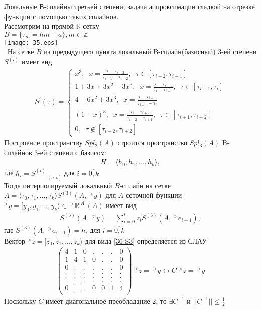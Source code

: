 \documentclass[__main__.tex]{subfiles}
\begin{document}
Локальные В-сплайны третьей степени, задача аппроксимации гладкой на отрезке функции с помощью таких сплайнов.\\

Рассмотрим на прямой $\underline{\mathbb{R}}$ сетку\\ $B = \{\tau_m = hm + a\}, m \in \mathbb{Z}$\\
\texttt{[image: 35.eps]}\\
\
На сетке $B$ из предыдущего пункта локальный B-сплайн(базисный) 3-ей степени $S^{(i)}$ имеет вид	
\begin{gather*}
	S^i(\tau) = 
	\begin{cases}
		x^3, \;\; x = \frac{\tau - \tau_{i-2}}{\tau_{i-1} - \tau_{i-2}}, \;\; \tau \in [\tau_{i-2}, \tau_{i-1}]\\
		1 + 3x + 3x^2 - 3x^3, \;\; x = \frac{\tau - \tau_{i-1}}{\tau_i - \tau_{i-1}}, \;\; \tau \in [\tau_{i-1}, \tau_i]\\
		4 - 6x^2 + 3x^3, \;\; x = \frac{\tau - \tau_{i+1}}{\tau_{i+1} - \tau_{i}}\\
		(1-x)^3, \;\; x = \frac{\tau_i - \tau_{i+2}}{\tau_{i+2} - \tau_{i+1}}, \;\; \tau \in [\tau_{i+1}, \tau_{i+2}]\\
		0, \;\; \tau \notin [\tau_{i-2}, \tau_{i+2}]
	\end{cases}
\end{gather*}
Построение пространству $Spl_2(A)$ строится пространство $Spl_3(A)$ B-сплайнов 3-ей степени с базисом:
\begin{gather*}
	H = \langle h_0, h_1, ..., h_k \rangle,
\end{gather*}
где $h_i = S^{(i)}|_{[a, b]}$ для $i = \overline{0,k}$\\
Тогда интерполируемый локальный $B$-сплайн на сетке $A = \langle \tau_0, \tau_1, ..., \tau_k \rangle S^{(3)}(A, \;^>y)$ для $A$-сеточной функции $^>y = [ y_0, y_1, ..., y_k \rangle \in\; ^> \mathbb{R}^{|A|}(A)$ имеет вид 
\begin{gather}
S^{(3)}(A, \;^>y) = \sum_{i=0}^{k}{z_iS^{(3)}(A, \;^>e_{i+1})},
\label{36-S3}	
\end{gather}
где $S^{(3)}(A, \;^>e_{i+1}) = h_i$ для $i = \overline{0,k}$\\
Вектор $^>z = [ z_0, z_1, ..., z_k \rangle$ для вида \ref{36-S3} определяется из СЛАУ
\begin{gather*}
	\begin{pmatrix}
		4 & 1 & 0 & . & . & . & 0\\
		1 & 4 & 1 & 0 & . & . & 0\\
		0 & . & . & . & . & . & 0\\
		. & . & . & . & . & . & .\\
		. & . & . & . & . & . & .\\
		. & . & . & . & . & . & .\\
		0 & . & . & 0 & 0 & 1 & 4\\				
	\end{pmatrix}
	\;^>z = \;^>y \leftrightarrow C\;^>z = \;^>y
\end{gather*}
Поскольку $C$ имеет диагональное преобладание 2, то $\exists C^{-1}$ и $||C^{-1}||\leq \frac{1}{2}$
\end{document}
